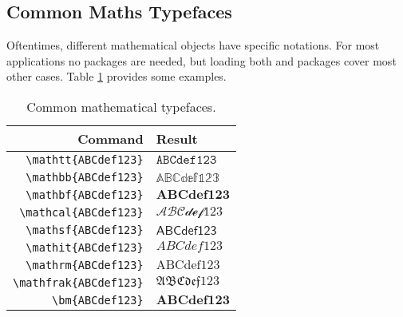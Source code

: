 \subsection{Common Maths Typefaces}
%
Oftentimes, different mathematical objects have specific notations.
For most applications no packages are needed, but loading both
 and  packages cover most other cases.  Table
\ref{t:mt} provides some examples.
\begin{table}[!htbp]
    \centering
    \caption{Common mathematical typefaces.}
    \label{t:mt}
    \begin{tabular}{rl}
        \toprule
        Command & Result \\
        \midrule
        \verb|\mathtt{ABCdef123}| & $\mathtt{ABCdef123}$ \\
        \verb|\mathbb{ABCdef123}| & $\mathbb{ABCdef123}$ \\
        \verb|\mathbf{ABCdef123}| & $\mathbf{ABCdef123}$ \\
        \verb|\mathcal{ABCdef123}| & $\mathcal{ABCdef123}$ \\
        \verb|\mathsf{ABCdef123}| & $\mathsf{ABCdef123}$ \\
        \verb|\mathit{ABCdef123}| & $\mathit{ABCdef123}$ \\
        \verb|\mathrm{ABCdef123}| & $\mathrm{ABCdef123}$ \\
        \verb|\mathfrak{ABCdef123}| & $\mathfrak{ABCdef123}$ \\
        \verb|\bm{ABCdef123}| & $\bm{ABCdef123}$ \\
        \bottomrule
    \end{tabular}
\end{table}
%
